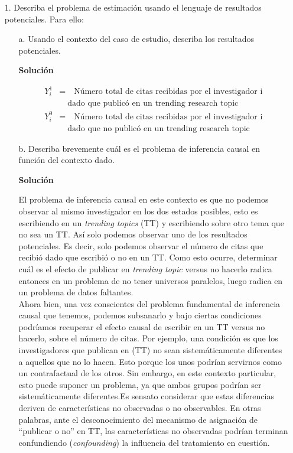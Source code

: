 \documentclass[a4paper, answers, addpoints, 11pt]{exam}
\newenvironment{solucion}{%
  \begin{mdframed}[
    backgroundcolor=blue!5,    %
    linecolor=blue!50,          %
    linewidth=2pt,              %
    leftmargin=10pt,            %
    rightmargin=8pt,           %
    topline=true,              %
    bottomline=true,            %
    roundcorner=10pt,           %
    innerleftmargin=10pt,       %
    innerrightmargin=10pt,      %
    innerbottommargin=10pt,     %
    innertopmargin=10pt         %
  ]%
  \begin{tcolorbox}[colframe=blue!50!black, colback=blue!50, coltitle=white, sharp corners=all, boxrule=1mm, width=\textwidth, halign=left, valign=center, top=0mm, bottom=0mm, left=0mm, right=0mm] \textbf{Solución} \end{tcolorbox} }{\end{mdframed}}
\begin{document}
\bigskip
\begin{itemize}
    \item[1.] Describa el problema de estimación usando el lenguaje de resultados potenciales. Para ello:  

    \begin{itemize}
        \item[a.] Usando el contexto del caso de estudio, describa los resultados potenciales.
        
\begin{solucion}
      
    \begin{align*}
    Y_i^1 &= \quad \text{Número total de citas recibidas por el investigador i} \\
          &\quad \text{dado que publicó en un trending research topic} \\
    Y_i^0 &= \quad \text{Número total de citas recibidas por el investigador i} \\
          &\quad \text{dado que no publicó en un trending research topic}
\end{align*}

\end{solucion}
        
        \item[b.] Describa brevemente cuál es el problema de inferencia causal en función del contexto dado.  
\begin{solucion}
El problema de inferencia causal en este contexto es que no podemos observar al mismo investigador en los dos estados posibles, esto es escribiendo en un \textit{trending topics} (TT) y escribiendo sobre otro tema que no sea un TT. Así solo podemos observar uno de los resultados potenciales. Es decir, solo podemos observar el número de citas que recibió dado que escribió o no en un TT. Como esto ocurre, determinar cuál es el efecto de publicar en \textit{trending topic} versus no hacerlo radica entonces en un problema de no tener universos paralelos, luego radica en un problema de datos faltantes. \\

Ahora bien, una vez conscientes del problema fundamental de inferencia causal que tenemos, podemos subsanarlo y bajo ciertas condiciones podríamos recuperar el efecto causal de escribir en un TT versus no hacerlo, sobre el número de citas. Por ejemplo, una condición es que los investigadores que publican en (TT) no sean sistemáticamente diferentes a aquellos que no lo hacen. Esto porque los unos podrían servirnos como un contrafactual de los otros. Sin embargo, en este contexto particular, esto puede suponer un problema, ya que ambos grupos podrían ser sistemáticamente diferentes.Es sensato considerar que estas diferencias deriven de características no observadas o no observables. En otras palabras, ante el desconocimiento del mecanismo de asignación de ``publicar o no'' en TT, las características no observadas podrían terminan confundiendo (\textit{confounding}) la influencia del tratamiento en cuestión.


\end{solucion}
\end{itemize}
\end{itemize}
\end{document}
